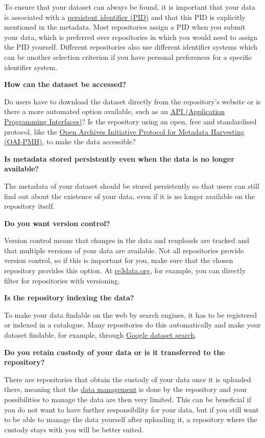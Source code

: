 \documentclass[
  oneside]{book}
\begin{document}
To ensure that your dataset can always be found, it is important that your data is associated with a \hyperref[PID]{persistent identifier (PID)} and that this PID is explicitly mentioned in the metadata. Most repositories assign a PID when you submit your data, which is preferred over repositories in which you would need to assign the PID yourself. Different repositories also use different identifier systems which can be another selection criterion if you have personal preferences for a specific identifier system.

\textbf{How can the dataset be accessed?}

Do users have to download the dataset directly from the repository's website or is there a more automated option available, such as an \hyperref[API]{API (Application Programming Interfaces)}? Is the repository using an open, free and standardised protocol, like the \href{https://www.openarchives.org/pmh/}{Open Archives Initiative Protocol for Metadata Harvesting (OAI-PMH)}, to make the data accessible?

\textbf{Is metadata stored persistently even when the data is no longer available?}

The metadata of your dataset should be stored persistently so that users can still find out about the existence of your data, even if it is no longer available on the repository itself.

\textbf{Do you want version control?}

Version control means that changes in the data and reuploads are tracked and that multiple versions of your data are available. Not all repositories provide version control, so if this is important for you, make sure that the chosen repository provides this option. At \href{http://re3data.org}{re3data.org}, for example, you can directly filter for repositories with versioning.

\textbf{Is the repository indexing the data?}

To make your data findable on the web by search engines, it has to be registered or indexed in a catalogue. Many repositories do this automatically and make your dataset findable, for example, through \href{https://datasetsearch.research.google.com/}{Google dataset search}.

\textbf{Do you retain custody of your data or is it transferred to the repository?}

There are repositories that obtain the custody of your data once it is uploaded there, meaning that the \hyperref[datamanagement]{data management} is done by the repository and your possibilities to manage the data are then very limited. This can be beneficial if you do not want to have further responsibility for your data, but if you still want to be able to manage the data yourself after uploading it, a repository where the custody stays with you will be better suited.
\end{document}
